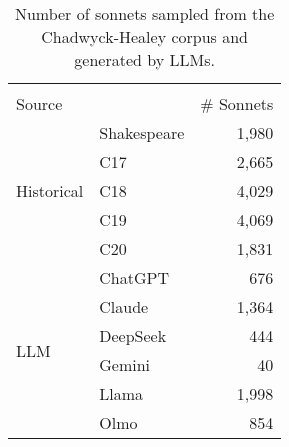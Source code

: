 \begin{table}[H]
  \centering
  \small
  \singlespacing
  \begin{tabular}{llr}
  \toprule
   &  &  \\
  Source &  & \# Sonnets  \\
  \midrule
  \multirow[t]{5}{*}{Historical} & Shakespeare & 1,980 \\
   & C17 & 2,665 \\
   & C18 & 4,029 \\
   & C19 & 4,069 \\
   & C20 & 1,831 \\
  \midrule
  \multirow[t]{6}{*}{LLM} & ChatGPT & 676 \\
   & Claude & 1,364 \\
   & DeepSeek & 444 \\
   & Gemini & 40 \\
   & Llama & 1,998 \\
   & Olmo & 854 \\
  \bottomrule
  \end{tabular}
  \caption{Number of sonnets sampled from the Chadwyck-Healey corpus and generated by LLMs.}
  \label{tab:num_sonnets_corpus}
\end{table}